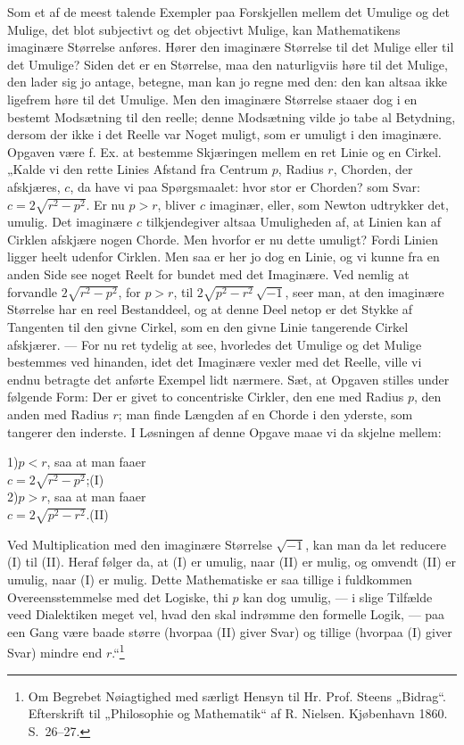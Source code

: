 \documentclass[12pt]{book}
\newcommand{\opage}[1]{\marginnote{\footnotesize\textit{[#1]}}}
\begin{document}
Som et af de meest talende Exempler paa Forskjellen
mellem det Umulige og det Mulige, det blot subjectivt og
det objectivt Mulige, kan Mathematikens imaginære Størrelse
anføres. Hører den imaginære Størrelse til det Mulige eller
til det Umulige? Siden det er en Størrelse, maa den naturligviis
høre til det Mulige, den lader sig jo antage, betegne,
man kan jo regne med den: den kan altsaa ikke ligefrem høre
til det Umulige. Men den imaginære Størrelse staaer dog
i en bestemt Modsætning til den reelle; denne Modsætning
vilde jo tabe al Betydning, dersom der ikke i det Reelle var
Noget muligt, som er umuligt i den imaginære. Opgaven
være f. Ex. at bestemme Skjæringen mellem en ret Linie og
en Cirkel. „Kalde vi den rette Linies Afstand fra Centrum
$p$, Radius $r$, Chorden, der afskjæres, $c$, da have vi paa Spørgsmaalet:
hvor stor er Chorden? som Svar: $c = 2\sqrt{r^2 - p^2}$.
Er nu $p > r$, bliver $c$ imaginær, eller, som Newton udtrykker
det, umulig. Det imaginære $c$ tilkjendegiver altsaa
Umuligheden af, at Linien kan af Cirklen afskjære nogen
Chorde. Men hvorfor er nu dette umuligt? Fordi Linien
ligger heelt udenfor Cirklen. Men saa er her jo dog en
Linie, og vi kunne fra en anden Side see noget Reelt for%
\opage{243}bundet med det Imaginære. Ved nemlig at forvandle
$2\sqrt{r^2 - p^2}$, for $p > r$, til $2\sqrt{p^2 - r^2}\,\sqrt{-1}$, seer man,
at den imaginære Størrelse har en reel Bestanddeel, og at
denne Deel netop er det Stykke af Tangenten til den givne
Cirkel, som en den givne Linie tangerende Cirkel afskjærer. ---
For nu ret tydelig at see, hvorledes det Umulige og det
Mulige bestemmes ved hinanden, idet det Imaginære vexler
med det Reelle, ville vi endnu betragte det anførte Exempel
lidt nærmere. Sæt, at Opgaven stilles under følgende Form:
Der er givet to concentriske Cirkler, den ene med Radius $p$,
den anden med Radius $r$; man finde Længden af en Chorde
i den yderste, som tangerer den inderste. I Løsningen af
denne Opgave maae vi da skjelne mellem:
\begin{center}
1)\enspace $p < r$, saa at man faaer\\
$c = 2\sqrt{r^2 - p^2}$;\qquad (I)\\
2)\enspace $p > r$, saa at man faaer\\
$c = 2\sqrt{p^2 - r^2}$.\qquad (II)
\end{center}
\noindent Ved Multiplication med den imaginære Størrelse $\sqrt{-1}$,
kan man da let reducere (I) til (II). Heraf følger da, at
(I) er umulig, naar (II) er mulig, og omvendt (II) er umulig,
naar (I) er mulig. Dette Mathematiske er saa tillige i fuldkommen
Overeensstemmelse med det Logiske, thi $p$ kan dog
umulig, --- i slige Tilfælde veed Dialektiken meget vel, hvad
den skal indrømme den formelle Logik, --- paa een Gang
være baade større (hvorpaa (II) giver Svar) og tillige (hvorpaa
(I) giver Svar) mindre end $r$.“\footnote{Om Begrebet Nøiagtighed med særligt Hensyn til Hr. Prof. Steens
„Bidrag“. Efterskrift til „Philosophie og Mathematik“ af R.
Nielsen. Kjøbenhavn 1860. S.~26--27.}%
\end{document}
